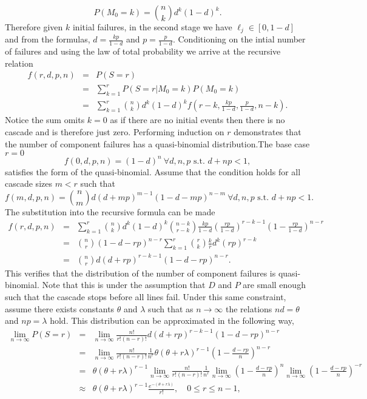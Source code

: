\documentclass{article}
\renewcommand{\l}{\ell}
\begin{document}
\[P(M_0=k) = {n\choose k} d^k(1-d)^k.\]
Therefore given $k$ initial failures, in the second stage we have $\l_j\in [0,1-d]$ and from the formulas, $d = \frac{kp}{1-d}$ and $p = \frac{p}{1-d}$. Conditioning on the intial number of failures and using the law of total probability we arrive at the recursive relation 
\begin{eqnarray*}
f(r,d,p,n) &=& P(S=r)\\
&=& \sum_{k=1}^{r} P(S=r|M_0 = k)P(M_0=k)\\
&=&\sum_{k=1}^{r} {n\choose k} d^k(1-d)^k f(r-k,\frac{kp}{1-d},\frac{p}{1-d}, n-k).
\end{eqnarray*}
Notice the sum omits $k=0$ as if there are no initial events then there is no cascade and is therefore just zero. Performing induction on $r$ demonstrates that the number of component failures has a quasi-binomial distribution.The base case $r=0$ 
\[f(0,d,p,n) = (1-d)^n \ \forall d,n,p \text{ s.t. } d+np<1,\] 
satisfies the form of the quasi-binomial. Assume that the condition holds for all cascade sizes $m<r$ such that
\[ f(m,d,p,n) = {n\choose m} d(d+mp)^{m-1} (1-d-mp)^{n-m} \ \forall d,n,p \text{ s.t. } d+np<1.\]
The substitution into the recursive formula can be made
\begin{eqnarray*}
f(r,d,p,n)&=&\sum_{k=1}^{r} {n\choose k} d^k(1-d)^k {n-k \choose r-k} \frac{kp}{1-d} \left(\frac{rp}{1-d}\right)^{r-k-1} \left(1-\frac{rp}{1-d}\right)^{n-r}\\
&=&{n \choose r} \left(1-d-rp\right)^{n-r} \sum_{k=1}^{r} {r\choose k} \frac{k}{r} d^k \left(rp\right)^{r-k}\\
&=& {n \choose r} d (d+rp)^{r-k-1} \left(1-d-rp\right)^{n-r}.
\end{eqnarray*}
This verifies that the distribution of the number of component failures is quasi-binomial. Note that this is under the assumption that $D$ and $P$ are small enough such that the cascade stops before all lines fail. Under this same constraint, assume there exists constants $\theta$ and $\lambda$ such that as $n\to \infty$ the relations $nd = \theta$ and $np = \lambda$ hold. This distribution can be approximated in the following way,
\begin{eqnarray*}
\lim_{n\to \infty} P(S=r) &=& \lim_{n\to \infty} \frac{n!}{r!(n-r)!} d (d+rp)^{r-k-1} \left(1-d-rp\right)^{n-r}\\
&=& \lim_{n\to \infty} \frac{n!}{r!(n-r)!} \frac{1}{n^r} \theta(\theta + r\lambda)^{r-1} \left(1-\frac{d-rp}{n}\right)^{n-r}\\
&=& \theta(\theta + r\lambda)^{r-1} \lim_{n\to \infty} \frac{n!}{r!(n-r)!} \frac{1}{n^r} \lim_{n\to \infty} \left(1-\frac{d-rp}{n}\right)^{n} \lim_{n\to \infty} \left(1-\frac{d-rp}{n}\right)^{-r}\\
&\approx& \theta(\theta + r\lambda)^{r-1} \frac{e^{-(\theta+r\lambda)}}{r!}, \quad 0\le r\le n-1,
\end{eqnarray*}
\end{document}
